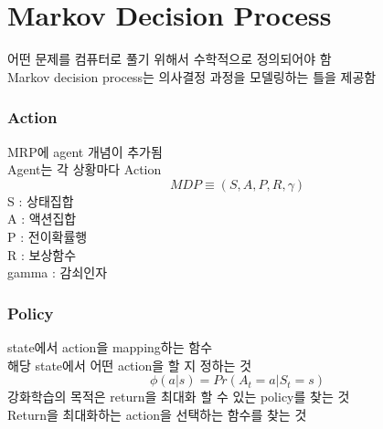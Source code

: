 \documentclass{beamer}
\begin{document}
\section{Markov Decision Process}
어떤 문제를 컴퓨터로 풀기 위해서 수학적으로 정의되어야 함\\
Markov decision process는 의사결정 과정을 모델링하는 틀을 제공함\\

\begin{frame}
	\frametitle{Action}
		MRP에 agent 개념이 추가됨\\	
		Agent는 각 상황마다 Action\\
		\begin{equation}\label{MDP}
			MDP \equiv (S, A, P, R, \gamma)
		\end{equation}
		S : 상태집합\\
		A : 액션집합\\
		P : 전이확률행\\
		R : 보상함수\\
		gamma : 감쇠인자\\
\end{frame}

\begin{frame}
	\frametitle{Policy}
		state에서 action을 mapping하는 함수\\	
		해당 state에서 어떤 action을 할 지 정하는 것\\
		\begin{equation}\label{policy}
			\phi(a|s) = Pr(A_{t} = a | S_{t} = s)
		\end{equation}
		강화학습의 목적은 return을 최대화 할 수 있는 policy를 찾는 것\\
		Return을 최대화하는 action을 선택하는 함수를 찾는 것\\
\end{frame}
\end{document}

